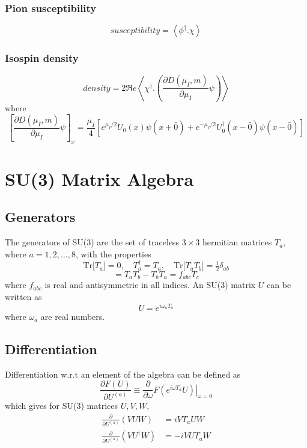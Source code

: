 \documentclass[a4paper,12pt]{article}
\newcommand{\tr}[1]{\text{Tr}\big[#1\big]}
\begin{document}
\subsubsection{Pion susceptibility}
\begin{equation}
 susceptibility = \left\langle \phi^{\dagger}.\chi \right\rangle
\end{equation}

\subsubsection{Isospin density}
\begin{equation}
 density = 2 \Re e \left\langle \chi^{\dagger}.\left(\frac{\partial D(\mu_I,m)}{\partial\mu_I}\psi\right) \right\rangle
\end{equation}
where
\begin{equation}
 \left[\frac{\partial D(\mu_I,m)}{\partial\mu_I}\psi\right]_x =\frac{\mu_I}{4}\left[ e^{\mu_I/2} U_0(x) \psi(x+\hat0) + e^{-\mu_I/2} U^{\dagger}_0(x-\hat0) \psi(x-\hat0)\right]
\end{equation}

\newpage
\appendix
\section{SU(3) Matrix Algebra}

\subsection{Generators}
The generators of SU(3) are the set of traceless $3\times 3$ hermitian matrices $T_a$, where $a=1,2,\ldots,8$, with the properties
\begin{equation}
\tr{T_a}=0, \quad T_a^{\dagger}=T_a, \quad \tr{T_a T_b} = \tfrac{1}{2}\delta_{ab}
\end{equation}
\begin{equation}
[T_a,T_b] = T_a T_b - T_b T_a = f_{abc} T_c
\end{equation}
where $f_{abc}$ is real and antisymmetric in all indices. An SU(3) matrix $U$ can be written as
\begin{equation}
U = e^{i \omega_a T_a}
\end{equation}
where $\omega_a$ are real numbers.

\subsection{Differentiation}
Differentiation w.r.t an element of the algebra can be defined as
\begin{equation}
\frac{\partial F(U)}{\partial U^{(a)}} \equiv \frac{\partial}{\partial \omega} \left. F(e^{i \omega T_a} U) \right|_{\omega=0}
\end{equation}
which gives for SU(3) matrices $U, V, W,$
\begin{align}
\frac{\partial}{\partial U^{(a)}} \left( V U W \right) &= i V T_a U W \\
\frac{\partial}{\partial U^{(a)}} \left( V U^{\dagger} W \right) &= -i V U T_a W
\end{align}
\end{document}
